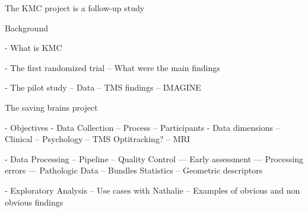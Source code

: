 \label{chap_kmc400}

The KMC project is a follow-up study 


Background

- What is KMC

- The first randomized trial
-- What were the main findings

- The pilot study
 -- Data
 -- TMS findings
 -- IMAGINE


The saving brains project

 - Objectives
 - Data Collection
 -- Process
 -- Participants
 - Data dimensions
 -- Clinical
 -- Psychology
 -- TMS Optitracking?
 -- MRI
 
 - Data Processing
 -- Pipeline
 -- Quality Control
 --- Early assessment
 --- Processing errors
 --- Pathologic Data
 -- Bundles Statistics
 -- Geometric descriptors

 - Exploratory Analysis
 -- Use cases with Nathalie
 -- Examples of obvious and non obvious findings



